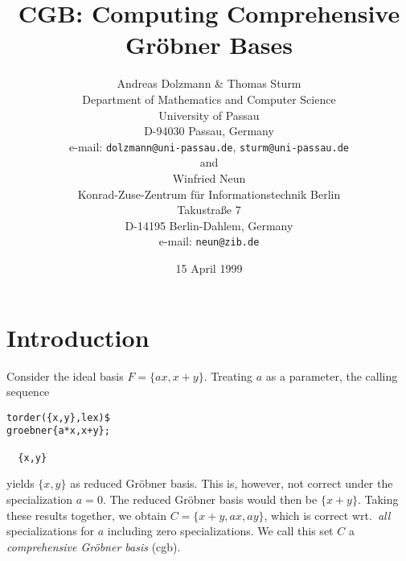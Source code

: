 %
%
%
%
\newcommand{\C}{{\bf C}}
\newcommand{\R}{{\bf R}}
\newcommand{\Id}{{\rm Id}}

\title{CGB: Computing Comprehensive Gr\"obner Bases}
\author{Andreas Dolzmann \& Thomas Sturm\\
Department of Mathematics and Computer Science\\ University of Passau\\
D-94030 Passau, Germany\\[1ex]
e-mail: {\tt dolzmann@uni-passau.de}, {\tt sturm@uni-passau.de}\\[1ex]
and\\[1ex]
Winfried Neun\\
Konrad-Zuse-Zentrum f\"ur Informationstechnik Berlin\\
Takustra\ss{}e 7\\
D-14195 Berlin-Dahlem, Germany\\[1ex]
e-mail: {\tt neun@zib.de}}
\date{15 April 1999}
\maketitle

\section{Introduction}
Consider the ideal basis $F=\{ax,x+y\}$. Treating $a$ as a parameter,
the calling sequence
\begin{verbatim}
torder({x,y},lex)$
groebner{a*x,x+y};

  {x,y}
\end{verbatim}
yields $\{x,y\}$ as reduced Gr\"obner basis. This is, however, not
correct under the specialization $a=0$. The reduced Gr\"obner basis
would then be $\{x+y\}$. Taking these results together, we obtain
$C=\{x+y,ax,ay\}$, which is correct wrt.~{\em all} specializations for
$a$ including zero specializations. We call this set $C$ a {\em
comprehensive Gr\"obner basis} ({\sc cgb}).

